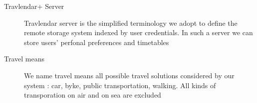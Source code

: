 \begin{description}
				\item [Travlendar+ Server] Travlendar server is the simplified terminology we adopt to define the remote storage system indexed by user credentials. In such a server we can store users' perfonal preferences and timetables  
				\item [Travel means] We name travel means all possible travel solutions considered by our system : car, byke, public transportation, walking. All kinds of transporation on air and on sea are excluded
\end{description}
